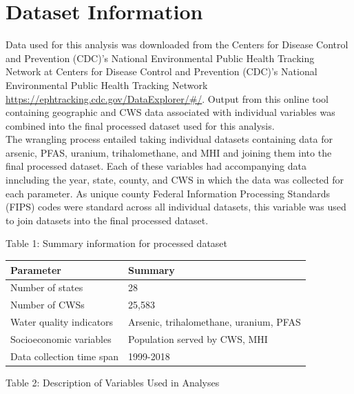 \documentclass[12pt,]{article}
\begin{document}
\newpage

\hypertarget{dataset-information}{%
\section{Dataset Information}\label{dataset-information}}

Data used for this analysis was downloaded from the Centers for Disease
Control and Prevention (CDC)'s National Environmental Public Health
Tracking Network at Centers for Disease Control and Prevention (CDC)'s
National Environmental Public Health Tracking Network
\url{https://ephtracking.cdc.gov/DataExplorer/\#/}. Output from this
online tool containing geographic and CWS data associated with
individual variables was combined into the final processed dataset used
for this analysis.\\
The wrangling process entailed taking individual datasets containing
data for arsenic, PFAS, uranium, trihalomethane, and MHI and joining
them into the final processed dataset. Each of these variables had
accompanying data inncluding the year, state, county, and CWS in which
the data was collected for each parameter. As unique county Federal
Information Processing Standards (FIPS) codes were standard across all
individual datasets, this variable was used to join datasets into the
final processed dataset.

Table 1: Summary information for processed dataset

\begin{longtable}[]{@{}ll@{}}
\toprule
\textbf{Parameter} & \textbf{Summary}\tabularnewline
\midrule
\endhead
Number of states & 28\tabularnewline
Number of CWSs & 25,583\tabularnewline
Water quality indicators & Arsenic, trihalomethane, uranium,
PFAS\tabularnewline
Socioeconomic variables & Population served by CWS, MHI\tabularnewline
Data collection time span & 1999-2018\tabularnewline
\bottomrule
\end{longtable}

Table 2: Description of Variables Used in Analyses
\end{document}
